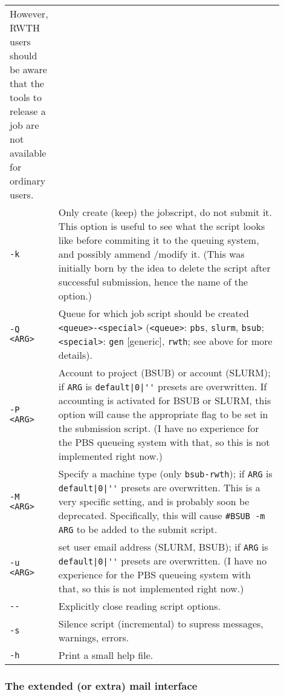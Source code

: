 \documentclass[   %
  final,          %
  a4paper         %
]{article}
\begin{document}
\begin{longtable}{p{0.1\linewidth}p{0.8\linewidth}}
    However, RWTH users should be aware that the tools to release a job are not available for ordinary users. \\
  {\lstinline`-k`}       & Only create (keep) the jobscript, do not submit it. 
    This option is useful to see what the script looks like before commiting it to the queuing system,
    and possibly ammend /modify it. 
    (This was initially born by the idea to delete the script after successful submission, hence the name of the option.)  \\
  {\lstinline`-Q <ARG>`} & Queue for which job script should be created {\lstinline`<queue>-<special>`} %
    ({\lstinline`<queue>`}: {\lstinline`pbs`}, {\lstinline`slurm`}, {\lstinline`bsub`}; %
     {\lstinline`<special>`}: {\lstinline`gen`} [generic], {\lstinline`rwth`}; see above for more details). \\
  {\lstinline`-P <ARG>`} & Account to project (BSUB) or account (SLURM); %
    if {\lstinline`ARG`} is {\lstinline`default|0|''`} presets are overwritten. 
    If accounting is activated for BSUB or SLURM, this option will cause the appropriate flag to be set in the submission script.
    (I have no experience for the PBS queueing system with that, so this is not implemented right now.)\\
  {\lstinline`-M <ARG>`} & Specify a machine type (only {\lstinline`bsub-rwth`}); %
    if {\lstinline`ARG`} is {\lstinline`default|0|''`} presets are overwritten. 
    This is a very specific setting, and is probably soon be deprecated.
    Specifically, this will cause \texttt{\#BSUB -m {\lstinline`ARG`}} to be added to the submit script. \\
  {\lstinline`-u <ARG>`} & set user email address (SLURM, BSUB); %
    if {\lstinline`ARG`} is {\lstinline`default|0|''`} presets are overwritten. 
    (I have no experience for the PBS queueing system with that, so this is not implemented right now.)\\
  {\lstinline`--`}       & Explicitly close reading script options. \\
  {\lstinline`-s`}       & Silence script (incremental) to supress messages, warnings, errors. \\
  {\lstinline`-h`}       & Print a small help file. \\
\end{longtable}

\subsubsection{The extended (or extra) mail interface}
\end{document}
